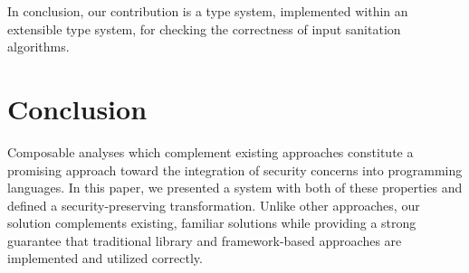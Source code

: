 \documentclass[9pt]{sig-alternate}
\theoremstyle{definition}
\begin{document}
In conclusion, our contribution is a type system, implemented within an extensible type system, for checking the correctness of input sanitation algorithms.

\section{Conclusion}


Composable analyses which complement existing approaches constitute a promising approach toward the integration of security concerns into programming languages.
In this paper, we presented a system with both of these properties and defined a security-preserving transformation.
Unlike other approaches, our solution complements existing, familiar solutions while providing a strong guarantee that traditional library and framework-based approaches are implemented and utilized correctly.


\end{document}
